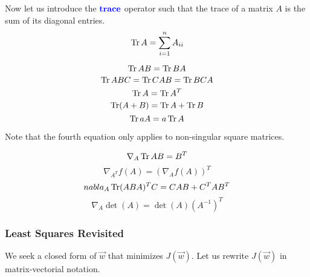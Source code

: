 \documentclass[12pt]{scrartcl}
\begin{document}
Now let us introduce the $\textbf{\color{blue} trace}$ operator such that the trace of a
matrix $A$ is the sum of its diagonal entries.
\[\operatorname{Tr} A = \sum_{i=1}^n A_{ii}\]
\begin{lemma}
    \[\operatorname{Tr} AB = \operatorname{Tr} BA\]
    \[\operatorname{Tr} ABC = \operatorname{Tr} CAB = \operatorname{Tr} BCA\]
    \[\operatorname{Tr} A = \operatorname{Tr} A^T\]
    \[\operatorname{Tr}(A + B) = \operatorname{Tr} A + \operatorname{Tr} B\]
    \[\operatorname{Tr} a A = a \operatorname{Tr} A\]
\end{lemma}
Note that the fourth equation only applies to non-singular square matrices.
\begin{lemma}
    \[\nabla_A \operatorname{Tr} AB = B^T\]
    \[\nabla_{A^T}f(A) = (\nabla_A f(A))^T\]
    \[nabla_A \operatorname{Tr} (ABA)^TC = CAB + C^TAB^T\]
    \[\nabla_A \det(A) = \det(A)(A^{-1})^T\]
\end{lemma}

\subsubsection{Least Squares Revisited}

We seek a closed form of $\vec{w}$ that minimizes $J(\vec{w})$. Let us rewrite
$J(\vec{w})$ in matrix-vectorial notation.
\end{document}
